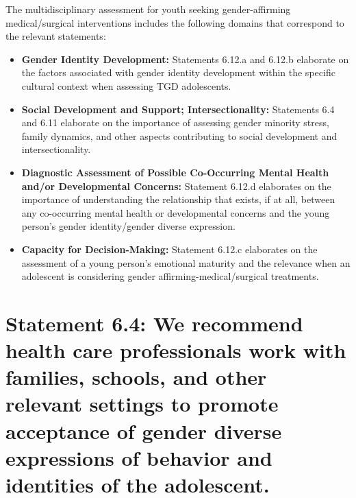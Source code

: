 \documentclass[
]{book}
\providecommand{\tightlist}{%
  \setlength{\itemsep}{0pt}\setlength{\parskip}{0pt}}
\begin{document}
The multidisciplinary assessment for youth
seeking gender-affirming medical/surgical interventions includes the following domains that correspond to the relevant statements:

\begin{itemize}
\tightlist
\item
  \textbf{Gender Identity Development:} Statements 6.12.a and 6.12.b elaborate on the factors associated with gender identity development within the specific cultural context when assessing TGD adolescents.
\item
  \textbf{Social Development and Support; Intersectionality:} Statements 6.4 and 6.11 elaborate on the importance of assessing gender minority stress, family dynamics, and other aspects contributing to social development and intersectionality.
\item
  \textbf{Diagnostic Assessment of Possible Co-Occurring Mental Health and/or Developmental Concerns:} Statement 6.12.d elaborates on the importance of understanding the relationship that exists, if at all, between any co-occurring mental health or developmental concerns and the young person's gender identity/gender diverse expression.
\item
  \textbf{Capacity for Decision-Making:} Statement 6.12.c elaborates on the assessment of a young person's emotional maturity and the relevance when an adolescent is considering gender affirming-medical/surgical treatments.
\end{itemize}

\hypertarget{statement-6.4-we-recommend-health-care-professionals-work-with-families-schools-and-other-relevant-settings-to-promote-acceptance-of-gender-diverse-expressions-of-behavior-and-identities-of-the-adolescent.}{%
\section*{Statement 6.4: We recommend health care professionals work with families, schools, and other relevant settings to promote acceptance of gender diverse expressions of behavior and identities of the adolescent.}\label{statement-6.4-we-recommend-health-care-professionals-work-with-families-schools-and-other-relevant-settings-to-promote-acceptance-of-gender-diverse-expressions-of-behavior-and-identities-of-the-adolescent.}}
\end{document}
